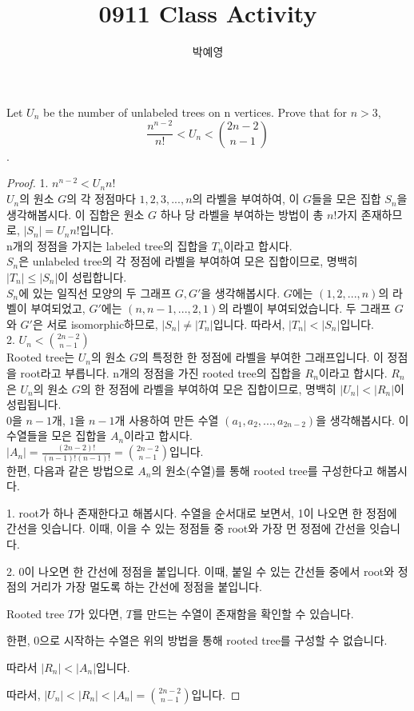\documentclass[a4paper, 12pt]{article}
\title{0911 Class Activity}
\author{박예영}
\begin{document}
\maketitle

Let $U_n$ be the number of unlabeled trees on n vertices.
Prove that for $n > 3$, $$ \frac{ n^{n-2} }{ n! } < U_n < \binom{2n - 2} {n - 1}$$.

\doublespacing

\begin{proof}

1. $\displaystyle n^{n-2} < U_n n!$
\\
$U_n$의 원소 $G$의 각 정점마다 $1, 2, 3, ... ,n$의 라벨을 부여하여, 이 $G$들을 모은 집합 $S_n$을 생각해봅시다. 이 집합은 원소 $G$ 하나 당 라벨을 부여하는 방법이 총 $n!$가지 존재하므로, $|S_n| = U_n n!$입니다.
\\ n개의 정점을 가지는 labeled tree의 집합을 $T_n$이라고 합시다.
\\ $S_n$은 unlabeled tree의 각 정점에 라벨을 부여하여 모은 집합이므로, 명백히 $|T_n| \leq |S_n|$이 성립합니다.
\\ $S_n$에 있는 일직선 모양의 두 그래프 $G, G'$을 생각해봅시다. $G$에는 $(1, 2, ..., n)$의 라벨이 부여되었고, $G'$에는 $(n, n-1, ..., 2, 1)$의 라벨이 부여되었습니다. 두 그래프 $G$와 $G'$은 서로 isomorphic하므로, $|S_n| \neq |T_n|$입니다.
따라서, $|T_n| < |S_n|$입니다.\\


2. $\displaystyle U_n < \binom{2n-2} {n-1}$
\\
Rooted tree는 $U_n$의 원소 $G$의 특정한 한 정점에 라벨을 부여한 그래프입니다. 이 정점을 root라고 부릅니다. n개의 정점을 가진 rooted tree의 집합을 $R_n$이라고 합시다. $R_n$은 $U_n$의 원소 $G$의 한 정점에 라벨을 부여하여 모은 집합이므로, 명백히 $|U_n| < |R_n|$이 성립됩니다.
\\
$0$을 $n-1$개, $1$을 $n-1$개 사용하여 만든 수열 $(a_1, a_2, ..., a_{2n-2})$을 생각해봅시다. 이 수열들을 모은 집합을 $A_n$이라고 합시다.
\\
$|A_n| = \displaystyle \frac{(2n-2)!}{(n-1)!(n-1)!} = \binom{2n-2}{n-1}$입니다.\\


\noindent
한편, 다음과 같은 방법으로 $A_n$의 원소(수열)를 통해 rooted tree를 구성한다고 해봅시다.

1. root가 하나 존재한다고 해봅시다. 수열을 순서대로 보면서, 1이 나오면 한 정점에 간선을 잇습니다. 이때, 이을 수 있는 정점들 중 root와 가장 먼 정점에 간선을 잇습니다.

\vskip 1pc %

2. 0이 나오면 한 간선에 정점을 붙입니다. 이때, 붙일 수 있는 간선들 중에서 root와 정점의 거리가 가장 멀도록 하는 간선에 정점을 붙입니다.

Rooted tree $T$가 있다면, $T$를 만드는 수열이 존재함을 확인할 수 있습니다.

한편, 0으로 시작하는 수열은 위의 방법을 통해 rooted tree를 구성할 수 없습니다.

따라서 $|R_n| < |A_n|$입니다.

따라서, $\displaystyle |U_n| < |R_n| < |A_n| = \binom{2n-2}{n-1}$입니다.
\end{proof}
\end{document}
